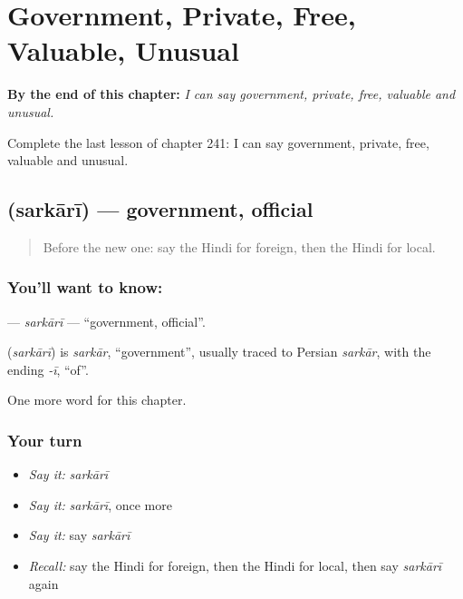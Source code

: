 
\chapter{Government, Private, Free, Valuable, Unusual}
\label{ch:hi-government-private-free-valuable-unusual}

\begin{chapteropening}
\textbf{By the end of this chapter:} \emph{I can say government, private, free, valuable and unusual.}

Complete the last lesson of chapter 241: I can say government, private, free, valuable and unusual.
\end{chapteropening}

\section[\texorpdfstring{\hi{सरकारी} (sarkārī)}{सरकारी (sarkārī)}]{ (sarkārī) — government, official}

\label{lesson:HI-C241-sarkari}



\begin{quote}
Before the new one: say the Hindi for foreign, then the Hindi for local.
\end{quote}

\subsection*{You'll want to know: }
\textbf{} — \emph{sarkārī} — \textquotedblleft{}government, official\textquotedblright{}.

\begin{cousinweb}
\textbf{} (\emph{sarkārī}) is \emph{sarkār}, \textquotedblleft{}government\textquotedblright{}, usually traced to Persian \emph{sarkār}, with the ending \emph{-ī}, \textquotedblleft{}of\textquotedblright{}.
\end{cousinweb}

\begin{grammarlens}[title={What you've built}]
One more word for this chapter.
\end{grammarlens}

\subsection*{Your turn}
\begin{itemize}
\raggedright
  \item \emph{Say it:} \emph{sarkārī}
  \item \emph{Say it:} \emph{sarkārī}, once more
  \item \emph{Say it:} say \emph{sarkārī}
  \item \emph{Recall:} say the Hindi for foreign, then the Hindi for local, then say \emph{sarkārī} again
\end{itemize}

